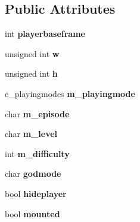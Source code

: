 \subsection*{Public Attributes}
\begin{DoxyCompactItemize}
\item 
\hypertarget{class_c_player_a8759275f882b21927e755c65ca6db3ec}{
int {\bfseries playerbaseframe}}
\label{class_c_player_a8759275f882b21927e755c65ca6db3ec}

\item 
\hypertarget{class_c_player_a1dd77374c98c7d9e630ce08f3f45e878}{
unsigned int {\bfseries w}}
\label{class_c_player_a1dd77374c98c7d9e630ce08f3f45e878}

\item 
\hypertarget{class_c_player_a611d2436ed2a404bce575b9856258eec}{
unsigned int {\bfseries h}}
\label{class_c_player_a611d2436ed2a404bce575b9856258eec}

\item 
\hypertarget{class_c_player_a6415d0608faeef02846585cfc7aae11d}{
e\_\-playingmodes {\bfseries m\_\-playingmode}}
\label{class_c_player_a6415d0608faeef02846585cfc7aae11d}

\item 
\hypertarget{class_c_player_a3d74bfe7b61f1be3ac20276b68392994}{
char {\bfseries m\_\-episode}}
\label{class_c_player_a3d74bfe7b61f1be3ac20276b68392994}

\item 
\hypertarget{class_c_player_a7b0e0a436137083d71581eed735f7d8c}{
char {\bfseries m\_\-level}}
\label{class_c_player_a7b0e0a436137083d71581eed735f7d8c}

\item 
\hypertarget{class_c_player_ab7c3fb1c43ace787446a9a48aa0314d6}{
int {\bfseries m\_\-difficulty}}
\label{class_c_player_ab7c3fb1c43ace787446a9a48aa0314d6}

\item 
\hypertarget{class_c_player_a247484d5f94a47af43415a07a9b0daaa}{
char {\bfseries godmode}}
\label{class_c_player_a247484d5f94a47af43415a07a9b0daaa}

\item 
\hypertarget{class_c_player_a757e166c076003be980f884a8b0f7a85}{
bool {\bfseries hideplayer}}
\label{class_c_player_a757e166c076003be980f884a8b0f7a85}

\item 
\hypertarget{class_c_player_a149c69f575190f63ff0fd6e68a257616}{
bool {\bfseries mounted}}
\label{class_c_player_a149c69f575190f63ff0fd6e68a257616}


\end{DoxyCompactItemize}
